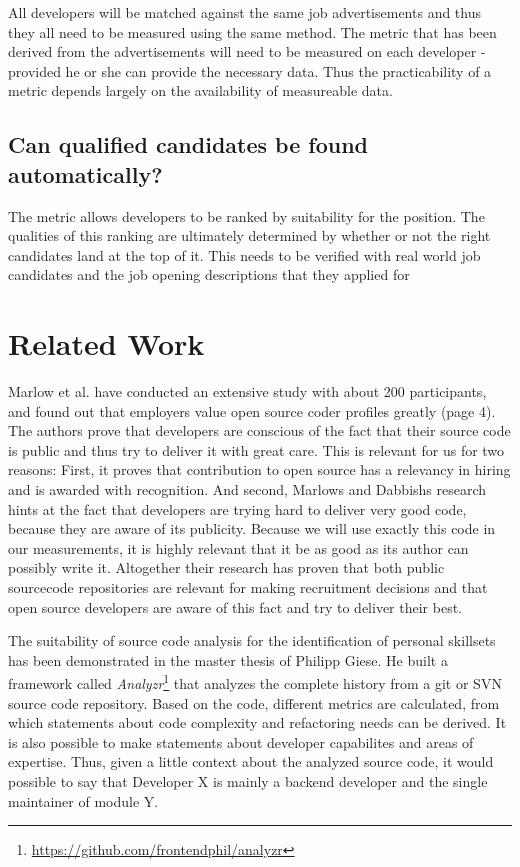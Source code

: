 All developers will be matched against the same job advertisements and thus
they all need to be measured using the same method. The metric that
has been derived from the advertisements will need to be measured
on each developer - provided he or she can provide the necessary data.
Thus the practicability of a metric depends largely on the availability
of measureable data.

\subsection{Can qualified candidates be found automatically?}\label{subsec:measurement-quality}
The metric allows developers to be ranked by suitability for the position.
The qualities of this ranking are ultimately determined by whether
or not the right candidates land at the top of it. This needs to be
verified with real world job candidates and the job opening descriptions
that they applied for

\section{Related Work}
Marlow et al.\cite{md:2013} have conducted an extensive study with about
200 participants, and found out that employers value
open source coder profiles greatly (page 4). The authors prove that developers are conscious of the fact
that their source code is public and thus try to deliver it with
great care. This is relevant for us for two reasons:
First, it proves that contribution to open source has a relevancy
in hiring and is awarded with recognition. And second, Marlows and Dabbishs
research hints at the fact that developers are trying hard to deliver very
good code, because they are aware of its publicity. Because we will use
exactly this code in our measurements, it is highly relevant that it be as good as its author can possibly write it.
Altogether their research has proven that both public sourcecode repositories
are relevant for making recruitment decisions and that open source developers
are aware of this fact and try to deliver their best.
\newline

The suitability of source code analysis for the identification of personal
skillsets has been demonstrated in the master thesis of Philipp Giese\cite{pg:2014}.
He built a framework called \textit{Analyzr}\footnote{\url{https://github.com/frontendphil/analyzr}}
that analyzes the complete history from a git or SVN source code repository.
Based on the code, different metrics are calculated, from which statements about
code complexity and refactoring needs can be derived. It is also possible
to make statements about developer capabilites and areas of expertise.
Thus, given a little context about the analyzed source code, it would possible
to say that \glqq Developer X is mainly a backend developer and the single maintainer of module Y\grqq.

